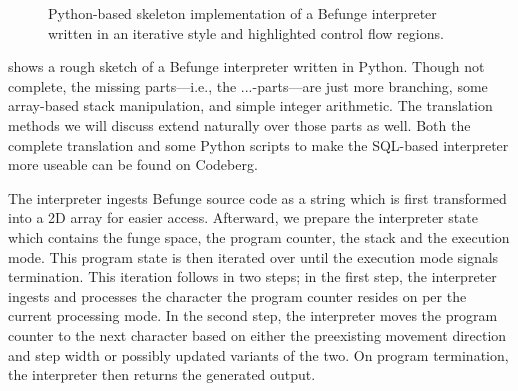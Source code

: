 \documentclass[sigconf,nonacm,screen,review,balance=false]{acmart}
\begin{document}
\begin{figure}[t]
  \caption{Python-based skeleton implementation of a Befunge interpreter written
   in an iterative style and highlighted control flow regions.}
  \label{fig:python-inter-skeleton}
\end{figure}

 shows a rough sketch of a Befunge interpreter
 written in Python. Though not complete, the missing parts---i.e., the \py
 {...}-parts---are just more branching, some array-based stack manipulation,
 and simple integer arithmetic. The translation methods we will discuss extend
 naturally over those parts as well. Both the complete translation and some
 Python scripts to make the SQL-based interpreter more useable can be found on
 Codeberg\footnotemark{}.


The interpreter ingests Befunge source code as a string which is first
transformed into a 2D array for easier access. Afterward, we prepare the
interpreter state which contains the funge space, the program counter, the
stack and the execution mode. This program state is then iterated over until
the execution mode signals termination. This iteration follows in two steps;
in the first step, the interpreter ingests and processes the character the
program counter resides on per the current processing mode. In the second
step, the interpreter moves the program counter to the next character based on
either the preexisting movement direction and step width or possibly updated
variants of the two. On program termination, the interpreter then returns the
generated output.
\end{document}
